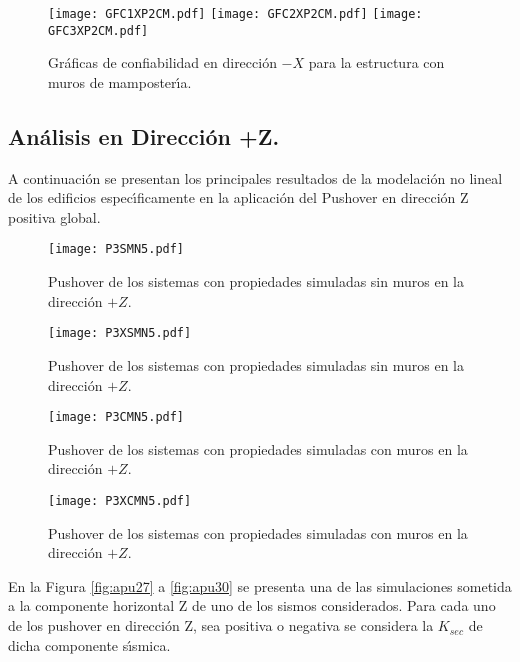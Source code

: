 \begin{figure} [htbp]
\centering
\texttt{[image: GFC1XP2CM.pdf]}
\texttt{[image: GFC2XP2CM.pdf]}
\texttt{[image: GFC3XP2CM.pdf]}
\caption{Gr\'aficas de confiabilidad en direcci\'on $-X$ para la estructura con muros de mamposter\'{\i}a.}
\label{fig:apu22}
\end{figure}

\paragraph{}

\newpage

\subsection{An\'alisis en Direcci\'on +Z.}

A continuaci\'on se presentan los principales resultados de la modelaci\'on no lineal de los edificios espec\'{\i}ficamente en la aplicaci\'on del Pushover en direcci\'on Z positiva global.

\begin{figure} [htbp]
\texttt{[image: P3SMN5.pdf]}
\caption{Pushover de los sistemas con propiedades simuladas sin muros en la direcci\'on $+Z$.}
\label{fig:apu23}
\end{figure}

\begin{figure} [htbp]
\texttt{[image: P3XSMN5.pdf]}
\caption{Pushover de los sistemas con propiedades simuladas sin muros en la direcci\'on $+Z$.}
\label{fig:apu24}
\end{figure}

\begin{figure} [htbp]
\texttt{[image: P3CMN5.pdf]}
\caption{Pushover de los sistemas con propiedades simuladas con muros en la direcci\'on $+Z$.}
\label{fig:apu25}
\end{figure}

\begin{figure} [htbp]
\texttt{[image: P3XCMN5.pdf]}
\caption{Pushover de los sistemas con propiedades simuladas con muros en la direcci\'on $+Z$.}
\label{fig:apu26}
\end{figure}

En la Figura \ref{fig:apu27} a \ref{fig:apu30} se presenta una de las simulaciones sometida a la componente horizontal Z de uno de los sismos considerados. Para cada uno de los pushover en direcci\'on Z, sea positiva o negativa se considera la $K_{sec}$ de dicha componente s\'{\i}smica. 


